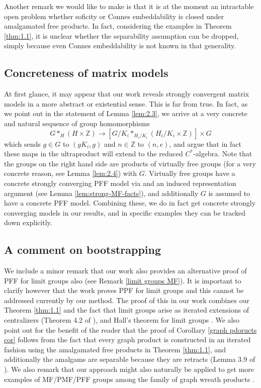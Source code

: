 \documentclass[10pt]{amsart}
\theoremstyle{definition}
\newcommand{\Z}{\ensuremath{\mathbb{Z}}}
\begin{document}
Another remark we would like to make is that it is at the moment an intractable open problem whether soficity or Connes embeddability is closed under amalgamated free products. In fact, considering the examples in Theorem \ref{thm:1.1}, it is unclear whether the separability assumption can be dropped, simply because even Connes embeddability is not known in that generality. 

\subsection*{Concreteness of matrix models}
At first glance, it may appear that our work reveals strongly convergent matrix models in a more abstract or existential sense. This is far from true. In fact, as we point out in the statement of Lemma \ref{lem:2.3}, we arrive at a very concrete and natural sequence of group homomorphisms
    \[G \ast_H (H \times \Z) \to [G/K_i\ast_{H_i/K_i} (H_i/K_i\times\Z)] \times G\] which sends $g\in G$ to $(gK_i, g)$ and $n\in \Z$ to $(n,e)$,
and argue that in fact these maps in the ultraproduct will extend to the reduced $C^*$-algebra. Note that the groups on the right hand side are products of virtually free groups (for a very concrete reason, see Lemma \ref{lem:2.4}) with $G$. Virtually free groups have a concrete strongly converging PFF model via \cite{BordenaveCollins2019} and an induced representation argument (see Lemma \ref{lem:strong-MF-facts}), and additionally $G$ is assumed to have a concrete PFF model. Combining these, we do in fact get concrete strongly converging models in our results, and in specific examples they can be tracked down explicitly. 



\subsection*{A comment on bootstrapping}\label{last rmk} We include a minor remark that our work also provides an alternative proof of PFF for limit groups also (see Remark \ref{limit groups MF}). It is important to clarify however that the work \cite{loudermagee2025limitgroups} proves PPF for limit groups and this cannot be addressed currently by our method. The proof of this in our work combines our Theorem \ref{thm:1.1} and the fact that limit groups arise as iterated extensions of centralizers (Theorem 4.2 of \cite{ChampetierGuirardel2005}), and Hall's theorem for limit groups \cite{Wilton2008Halls}. We also point out for the benefit of the reader that the proof of Corollary \ref{graph pdoructs cor} follows from the fact that every graph product is constructed in an iterated fashion using the amalgamated free products in Theorem \ref{thm:1.1}, and additionally the amalgams are separable because they are retracts (Lemma 3.9 of \cite{HsuWise1999}). We also remark that our approach might also naturally be applied to get more examples of MF/PMF/PFF groups among the family of graph wreath products \cite{gao2024soficactionsgraphs}. 
\end{document}
